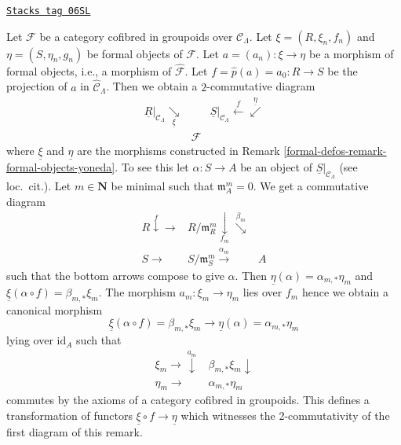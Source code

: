 \begin{remark}
\label{formal-defos-remark-formal-objects-yoneda-map}
\href{https://stacks.math.columbia.edu/tag/06SL}{\texttt{Stacks tag 06SL}}

Let $\mathcal{F}$ be a category cofibred in groupoids over
$\mathcal{C}_\Lambda$. Let $\xi = (R, \xi_n, f_n)$ and
$\eta = (S, \eta_n, g_n)$ be formal objects of $\mathcal{F}$.
Let $a = (a_n) : \xi \to \eta$ be a morphism of formal objects, i.e.,
a morphism of $\widehat{\mathcal{F}}$. Let
$f = \widehat{p}(a) = a_0 : R \to S$ be the projection of $a$ in
$\widehat{\mathcal{C}}_\Lambda$. Then we obtain a $2$-commutative
diagram
$$
\begin{array}{ccc}\underline{R}|_{\mathcal{C}_\Lambda} \underset{\underline{\xi}}{\searrow} &  & \underline{S}|_{\mathcal{C}_\Lambda} \overset{f}{\longleftarrow}\overset{\underline{\eta}}{\swarrow} \\  & \mathcal{F} & \end{array}
$$
where $\underline{\xi}$ and $\underline{\eta}$ are the morphisms
constructed in
Remark \ref{formal-defos-remark-formal-objects-yoneda}.
To see this let $\alpha : S \to A$ be an object of
$\underline{S}|_{\mathcal{C}_\Lambda}$ (see loc.\ cit.).
Let $m \in \mathbf{N}$ be minimal such that $\mathfrak m_A^m = 0$.
We get a commutative diagram
$$
\begin{array}{ccc}R \overset{f}{\downarrow}\longrightarrow & R/\mathfrak m_R^m \underset{f_m}{\downarrow}\overset{\beta_m}{\searrow} &  \\ S \longrightarrow & S/\mathfrak m_S^m \overset{\alpha_m}{\longrightarrow} & A\end{array}
$$
such that the bottom arrows compose to give $\alpha$.
Then $\underline{\eta}(\alpha) = \alpha_{m, *}\eta_m$ and
$\underline{\xi}(\alpha \circ f) = \beta_{m, *}\xi_m$. The morphism
$a_m : \xi_m \to \eta_m$ lies over $f_m$ hence we obtain a canonical
morphism
$$
\underline{\xi}(\alpha \circ f) = \beta_{m, *}\xi_m
\longrightarrow
\underline{\eta}(\alpha) = \alpha_{m, *}\eta_m
$$
lying over $\text{id}_A$ such that
$$
\begin{array}{cc}\xi_m \longrightarrow\overset{a_m}{\downarrow} & \beta_{m, *}\xi_m \downarrow \\ \eta_m \longrightarrow & \alpha_{m, *}\eta_m\end{array}
$$
commutes by the axioms of a category cofibred in groupoids. This defines
a transformation of functors $\underline{\xi} \circ f \to \underline{\eta}$
which witnesses the 2-commutativity of the first diagram of this remark.
\end{remark}

